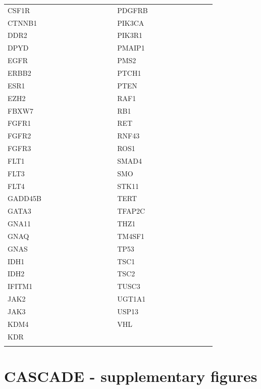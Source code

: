 \begin{table}
\begin{tabular}{|C{0.15\linewidth} | C{0.25\linewidth} | C{0.02\linewidth} | C{0.15\linewidth} | C{0.25\linewidth}|}
 CSF1R & &  & PDGFRB & \\
 CTNNB1 & &  & PIK3CA & \\
 DDR2 & &  & PIK3R1 & \\
 DPYD & &  & PMAIP1 & \textcite{Do2019} \\
 EGFR & &  & PMS2 & \\
 ERBB2 & &  & PTCH1 & \\
 ESR1 & &  & PTEN & \\
 EZH2 & &  & RAF1 & \\
 FBXW7 & &  & RB1 & \\
 FGFR1 & &  & RET & \\
 FGFR2 & &  & RNF43 & \\
 FGFR3 & &  & ROS1 & \\
 FLT1 & &  & SMAD4 & \\
 FLT3 & &  & SMO & \\
 FLT4 & &  & STK11 & \\
 GADD45B & \textcite{Do2019} &  & TERT & \\
 GATA3 & &  & TFAP2C & \textcite{Do2019} \\
 GNA11 & &  & THZ1 & \textcite{Cheng2018} \\
 GNAQ & &  & TM4SF1 & \textcite{Ye2019} \\
 GNAS & &  & TP53 & \\
 IDH1 & &  & TSC1 & \\
 IDH2 & &  & TSC2 & \\
 IFITM1 & \textcite{Yang2018} &  & TUSC3 & \textcite{Feng2018a} \\
 JAK2 & &  & UGT1A1 & \\
 JAK3 & &  & USP13 & \textcite{Wu2019a} \\
 KDM4 & \textcite{Sun2020} &  & VHL & \\
 KDR & &  &  & \\
 \hhline{|-|-|~|-|-|}
\bottomrule
\end{tabular}
\end{table}


\section{CASCADE - supplementary figures}
\label{ch-cascadeSuppFig}


